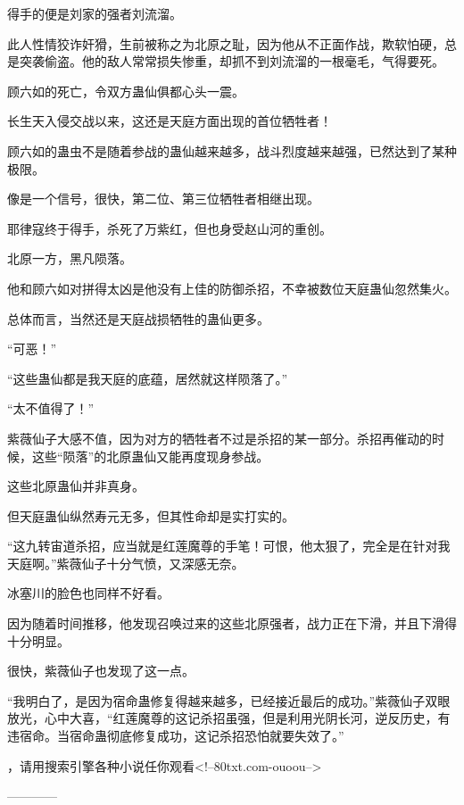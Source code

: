 \begin{this_body}
得手的便是刘家的强者刘流溜。

此人性情狡诈奸猾，生前被称之为北原之耻，因为他从不正面作战，欺软怕硬，总是突袭偷盗。他的敌人常常损失惨重，却抓不到刘流溜的一根毫毛，气得要死。

顾六如的死亡，令双方蛊仙俱都心头一震。

长生天入侵交战以来，这还是天庭方面出现的首位牺牲者！

顾六如的蛊虫不是随着参战的蛊仙越来越多，战斗烈度越来越强，已然达到了某种极限。

像是一个信号，很快，第二位、第三位牺牲者相继出现。

耶律寇终于得手，杀死了万紫红，但也身受赵山河的重创。

北原一方，黑凡陨落。

他和顾六如对拼得太凶是他没有上佳的防御杀招，不幸被数位天庭蛊仙忽然集火。

总体而言，当然还是天庭战损牺牲的蛊仙更多。

“可恶！”

“这些蛊仙都是我天庭的底蕴，居然就这样陨落了。”

“太不值得了！”

紫薇仙子大感不值，因为对方的牺牲者不过是杀招的某一部分。杀招再催动的时候，这些“陨落”的北原蛊仙又能再度现身参战。

这些北原蛊仙并非真身。

但天庭蛊仙纵然寿元无多，但其性命却是实打实的。

“这九转宙道杀招，应当就是红莲魔尊的手笔！可恨，他太狠了，完全是在针对我天庭啊。”紫薇仙子十分气愤，又深感无奈。

冰塞川的脸色也同样不好看。

因为随着时间推移，他发现召唤过来的这些北原强者，战力正在下滑，并且下滑得十分明显。

很快，紫薇仙子也发现了这一点。

“我明白了，是因为宿命蛊修复得越来越多，已经接近最后的成功。”紫薇仙子双眼放光，心中大喜，“红莲魔尊的这记杀招虽强，但是利用光阴长河，逆反历史，有违宿命。当宿命蛊彻底修复成功，这记杀招恐怕就要失效了。”

，请用搜索引擎各种小说任你观看<!--80txt.com-ouoou-->

------------

\end{this_body}

